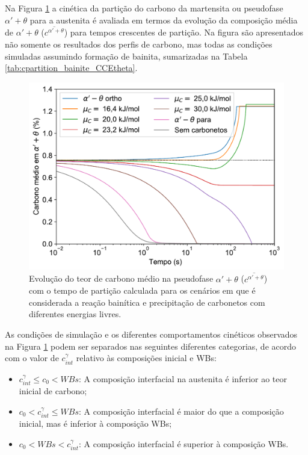 Na Figura \ref{fig:coupled_cavg} a cinética da partição do carbono da martensita ou pseudofase $\alpha' + \theta$ para a austenita é avaliada em termos da evolução da composição média de $\alpha' + \theta$ ($\overline{c^{\alpha' + \theta}}$) para tempos crescentes de partição. Na figura são apresentados não somente os resultados dos perfis de carbono, mas todas as condições simuladas assumindo formação de bainita, sumarizadas na Tabela \ref{tab:cpartition_bainite_CCEtheta}.

\begin{figure}
  \includegraphics[height=.6\textwidth]{img/cpartition/coupled_cavg.pdf}
  \caption{Evolução do teor de carbono médio na pseudofase $\alpha' + \theta$ ($\overline{c^{\alpha' + \theta}}$) com o tempo de partição calculada para os cenários em que é considerada a reação bainítica e precipitação de carbonetos com diferentes energias livres.}
  \label{fig:coupled_cavg}
\end{figure}

As condições de simulação e os diferentes comportamentos cinéticos observados na Figura \ref{fig:coupled_cavg} podem ser separados nas seguintes diferentes categorias, de acordo com o valor de $c^\gamma_{int}$ relativo às composições inicial e WBs:

\begin{itemize}
  \item $c^\gamma_{int} \leq c_0 < WBs$: A composição interfacial na austenita é inferior ao teor inicial de carbono;
  \item $c_0 < c^\gamma_{int} \leq WBs$: A composição interfacial é maior do que a composição inicial, mas é inferior à composição WBs;
  \item $c_0 < WBs < c^\gamma_{int}$: A composição interfacial é superior à composição WBs.
\end{itemize}

